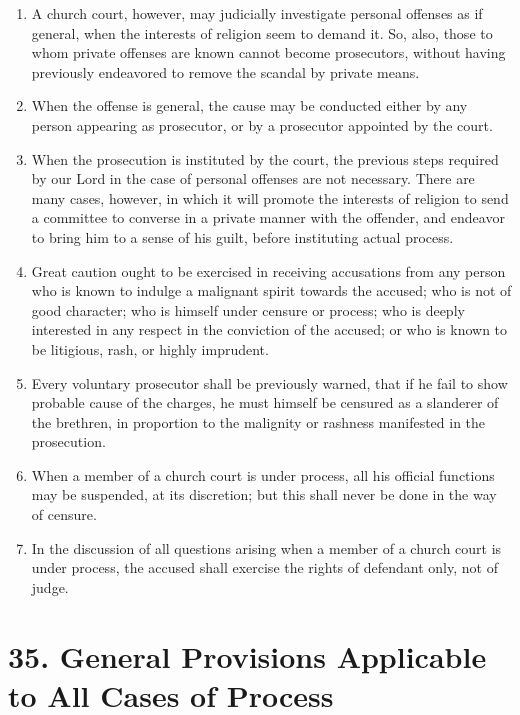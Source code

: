 \documentclass[
]{book}
\providecommand{\tightlist}{%
  \setlength{\itemsep}{0pt}\setlength{\parskip}{0pt}}
\begin{document}
\begin{enumerate}
\def\labelenumi{\arabic{enumi}.}
\setcounter{enumi}{5}
\tightlist
\item
  A church court, however, may judicially investigate personal offenses as if general, when the interests of religion seem to demand it. So, also, those to whom private offenses are known cannot become prosecutors, without having previously endeavored to remove the scandal by private means.
\item
  When the offense is general, the cause may be conducted either by any person appearing as prosecutor, or by a prosecutor appointed by the court.
\item
  When the prosecution is instituted by the court, the previous steps required by our Lord in the case of personal offenses are not necessary. There are many cases, however, in which it will promote the interests of religion to send a committee to converse in a private manner with the offender, and endeavor to bring him to a sense of his guilt, before instituting actual process.
\item
  Great caution ought to be exercised in receiving accusations from any person who is known to indulge a malignant spirit towards the accused; who is not of good character; who is himself under censure or process; who is deeply interested in any respect in the conviction of the accused; or who is known to be litigious, rash, or highly imprudent.
\item
  Every voluntary prosecutor shall be previously warned, that if he fail to show probable cause of the charges, he must himself be censured as a slanderer of the brethren, in proportion to the malignity or rashness manifested in the prosecution.
\item
  When a member of a church court is under process, all his official functions may be suspended, at its discretion; but this shall never be done in the way of censure.
\item
  In the discussion of all questions arising when a member of a church court is under process, the accused shall exercise the rights of defendant only, not of judge.
\end{enumerate}

\hypertarget{general-provisions-applicable-to-all-cases-of-process}{%
\section*{35. General Provisions Applicable to All Cases of Process}\label{general-provisions-applicable-to-all-cases-of-process}}
\end{document}

